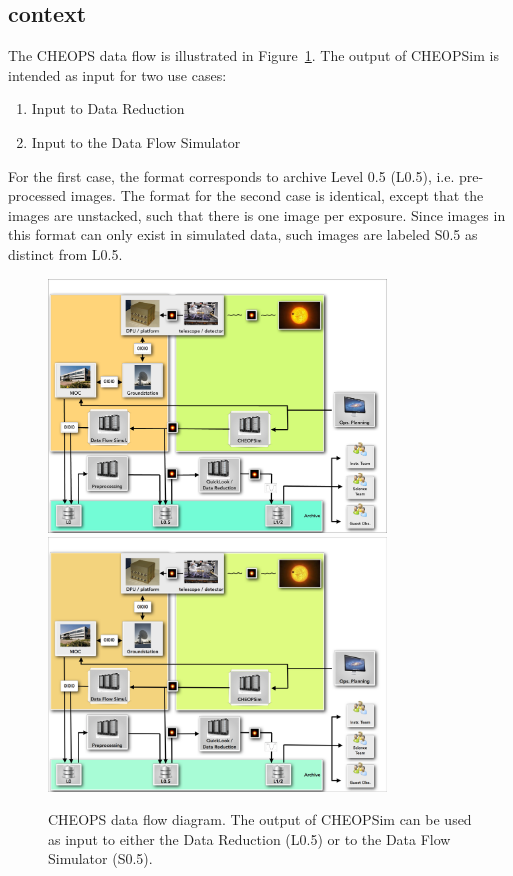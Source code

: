 \documentclass[11pt]{article}      %
\begin{document}
\subsection{context}
The CHEOPS data flow is illustrated in Figure~\ref{fig:dataflow}. The output of CHEOPSim is intended as input for two use cases:
\begin{enumerate}
\item Input to Data Reduction
\item Input to the Data Flow Simulator 
\end{enumerate}
For the first case, the format corresponds to archive Level 0.5 (L0.5), i.e. pre-processed images. The format for the second case is identical, except that the images are unstacked, such that there is one image per exposure. Since images in this format can only exist in simulated data, such images are labeled S0.5 as distinct from L0.5.

\begin{figure}[hbtp]
  \begin{center}
    \ifpdf
    {\includegraphics[width=0.8\textwidth]{cheops_data_flow.pdf}}
    \else
    {\includegraphics[width=0.8\textwidth]{cheops_data_flow.png}}
    \fi
    \caption{CHEOPS data flow diagram. The output of CHEOPSim can be used as input to either the Data Reduction (L0.5) or to the Data Flow Simulator (S0.5).}
    \label{fig:dataflow}
  \end{center}
\end{figure}
\end{document}
